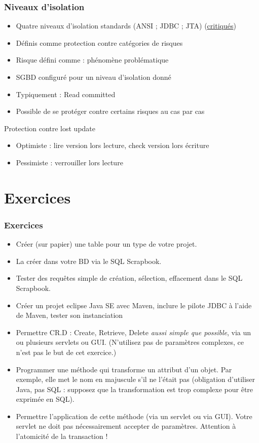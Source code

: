 \documentclass[english, french]{beamer}
\begin{document}
\begin{frame}
	\frametitle{Niveaux d’isolation}
	\begin{itemize}
		\item Quatre niveaux d’isolation standards (ANSI ; JDBC ; JTA) {\tiny (\href{http://www.cs.umb.edu/~poneil/iso.pdf}{critiqués})}
		\item Définis comme protection contre catégories de risques
		\item Risque défini comme : phénomène problématique
		\item SGBD configuré pour un niveau d’isolation donné
		\item Typiquement : Read committed
		\item Possible de se protéger contre certains risques au cas par cas
	\end{itemize}
	\begin{block}{Protection contre  lost update}
		\begin{itemize}
			\item Optimiste : lire version lors lecture, check version lors écriture
			\item Pessimiste : verrouiller lors lecture
		\end{itemize}
	\end{block}
\end{frame}

\section{Exercices}
\begin{frame}[allowframebreaks]
	\frametitle{Exercices}
	\begin{itemize}
		\item Créer (sur papier) une table pour un type de votre projet.
		\item La créer dans votre BD via le SQL Scrapbook.
		\item Tester des requêtes simple de création, sélection, effacement dans le SQL Scrapbook.
		\item Créer un projet eclipse Java SE avec Maven, inclure le pilote JDBC à l’aide de Maven, tester son instanciation
		\item Permettre CR.D : Create, Retrieve, Delete \emph{aussi simple que possible}, via un ou plusieurs servlets ou GUI. (N’utilisez pas de paramètres complexes, ce n’est pas le but de cet exercice.)
		\item Programmer une méthode qui transforme un attribut d’un objet. Par exemple, elle met le nom en majuscule s’il ne l’était pas (obligation d’utiliser Java, pas SQL : supposez que la transformation est trop complexe pour être exprimée en SQL).
		\item[+\footnote{Le + indique que cet aspect intervient dans la note}] \label{Exercices} Permettre l’application de cette méthode (via un servlet ou via GUI). Votre servlet ne doit pas nécessairement accepter de paramètres. Attention à l’atomicité de la transaction !
	\end{itemize}
\end{frame}
\end{document}
